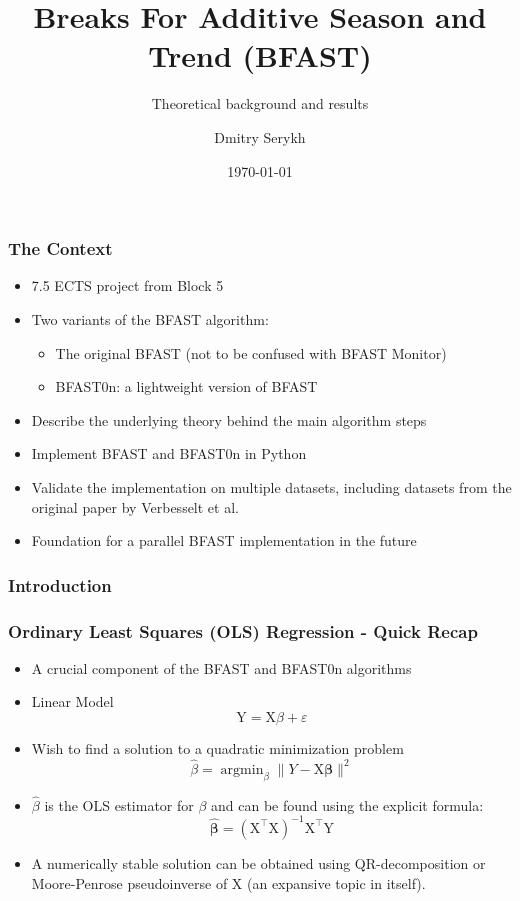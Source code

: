 \documentclass[9pt]{beamer}
\title{Breaks For Additive Season and Trend (BFAST)}
\subtitle{Theoretical background and results}
\institute{Department of Computer Science}
\author{Dmitry Serykh}
\date{\today}
\begin{document}
\frame[plain]{\titlepage}

\begin{frame}
\frametitle{The Context}
\begin{itemize}
\item 7.5 ECTS project from Block 5
\item Two variants of the BFAST algorithm:
  \begin{itemize}
  \item The original BFAST (not to be confused with BFAST Monitor)
  \item BFAST0n: a lightweight version of BFAST
  \end{itemize}
\item Describe the underlying theory behind the main algorithm steps
\item Implement BFAST and BFAST0n in Python
\item Validate the implementation on multiple datasets, including datasets from
  the original paper by Verbesselt et al.
\item Foundation for a parallel BFAST implementation in the future
\end{itemize}
\end{frame}

\begin{frame}
  \frametitle{Introduction}
  
\end{frame}

\begin{frame}
  \frametitle{Ordinary Least Squares (OLS) Regression - Quick Recap}
  \begin{itemize}
    \item A crucial component of the BFAST and BFAST0n algorithms
    \item Linear Model
      \[
      \mathrm{Y} = \mathrm{X}\beta + \varepsilon
      \]
    \item Wish to find a solution to a quadratic minimization problem
      \[
      \hat{\beta} = \operatorname{argmin}_{\beta} \|Y-\mathrm{X} \boldsymbol{\beta}\|^{2}
      \]
    \item $\hat{\beta}$ is the OLS estimator for $\beta$ and can be found using the explicit formula:
      \[
      \hat{\boldsymbol{\beta}}=\left(\mathrm{X}^{\top} \mathrm{X}\right)^{-1}\mathrm{X}^{\top} \mathrm{Y}
      \]
    \item A numerically stable solution can be obtained using QR-decomposition or Moore-Penrose
      pseudoinverse of $\mathrm{X}$ (an expansive topic in itself).
  \end{itemize}
\end{frame}
\end{document}
